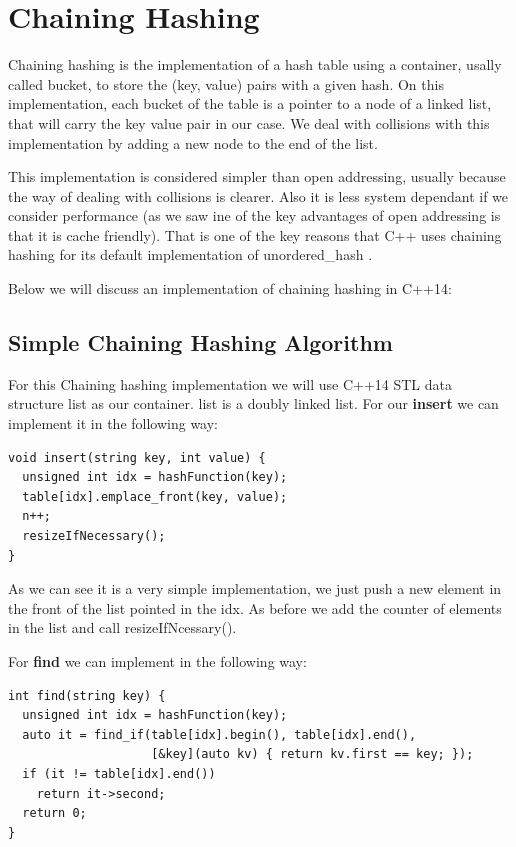 \section{Chaining Hashing}

Chaining hashing is the implementation of a hash table using a container, usally called bucket, to store the (key, value) pairs with a given hash. On this implementation, each bucket of the table is a pointer to a node of a linked list, that will carry the key value pair in our case. We deal with collisions with this implementation by adding a new node to the end of the list.

This implementation is considered simpler than open addressing, usually because the way of dealing with collisions is clearer. Also it is less system dependant if we consider performance (as we saw ine of the key advantages of open addressing is that it is cache friendly). That is one of the key reasons that C++ uses chaining hashing for its default implementation of unordered\_hash \cite{HashTableProposal}.

Below we will discuss an implementation of chaining hashing in C++14:

\subsection{Simple Chaining Hashing Algorithm}

For this Chaining hashing implementation we will use C++14 STL data structure list as our container. list is a doubly linked list. For our \textbf{insert} we can implement it in the following way:

\begin{lstlisting}
void insert(string key, int value) {
  unsigned int idx = hashFunction(key);      
  table[idx].emplace_front(key, value);
  n++;
  resizeIfNecessary();
}
\end{lstlisting}

As we can see it is a very simple implementation, we just push a new element in the front of the list pointed in the idx. As before we add the counter of elements in the list and call resizeIfNcessary().

For \textbf{find} we can implement in the following way:

\begin{lstlisting}
int find(string key) {
  unsigned int idx = hashFunction(key);
  auto it = find_if(table[idx].begin(), table[idx].end(),
                    [&key](auto kv) { return kv.first == key; });
  if (it != table[idx].end())
    return it->second;
  return 0;
}
\end{lstlisting}

